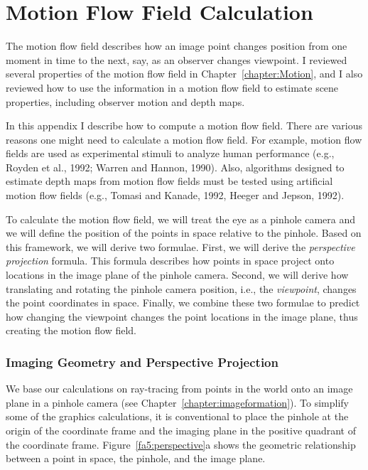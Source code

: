 \chapter{Motion Flow Field Calculation}
\label{chapter:motionFlow} The motion flow field describes how an
image point changes position from one moment in time to the next, say,
as an observer changes viewpoint.  I reviewed several properties of
the motion flow field in Chapter~\ref{chapter:Motion}, and I also
reviewed how to use the information in a motion flow field to estimate
scene properties, including observer motion and depth maps.

In this appendix I describe how to compute a motion flow field.  There
are various reasons one might need to calculate a motion flow field.
For example, motion flow fields are used as experimental stimuli to
analyze human performance (e.g., Royden et al., 1992; Warren and
Hannon, 1990).  Also, algorithms designed to estimate depth maps from
motion flow fields must be tested using artificial motion flow fields
(e.g., Tomasi and Kanade, 1992, Heeger and Jepson, 1992).

To calculate the motion flow field, we will treat the eye as a pinhole
camera and we will define the position of the points in space relative
to the pinhole.  Based on this framework, we will derive two formulae.
First, we will derive the {\em perspective projection} formula.  This
formula describes how points in space project onto locations in the
image plane of the pinhole camera.  Second, we will derive how
translating and rotating the pinhole camera position, i.e., the {\em
viewpoint}, changes the point coordinates in space.  Finally, we
combine these two formulae to predict how changing the viewpoint
changes the point locations in the image plane, thus creating the
motion flow field.

\subsection*{Imaging Geometry and Perspective Projection} We base our
calculations on ray-tracing from points in the world onto an image
plane in a pinhole camera (see Chapter~\ref{chapter:imageformation}).
To simplify some of the graphics calculations, it is conventional to
place the pinhole at the origin of the coordinate frame and the
imaging plane in the positive quadrant of the coordinate frame.
Figure~\ref{fa5:perspective}a shows the geometric relationship between
a point in space, the pinhole, and the image plane.

